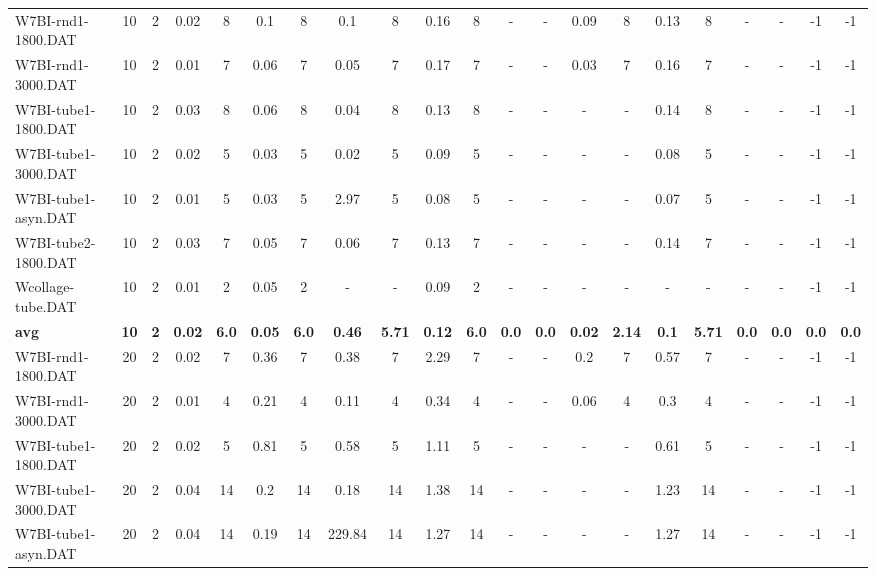 \begin{sidewaystable}[!ht]
{\begin{tabular}{lcccccccccccccccccccc}
W7BI-rnd1-1800.DAT & 10 & 2 &  \textcolor{blue2}{0.02} & 8 & 0.1 & 8 & 0.1 & 8 & 0.16 & 8 &  - &  - & 0.09 & 8 & 0.13 & 8 &  - &  - & -1 & -1 \\
W7BI-rnd1-3000.DAT & 10 & 2 &  \textcolor{blue2}{0.01} & 7 & 0.06 & 7 & 0.05 & 7 & 0.17 & 7 &  - &  - & 0.03 & 7 & 0.16 & 7 &  - &  - & -1 & -1 \\
W7BI-tube1-1800.DAT & 10 & 2 &  \textcolor{blue2}{0.03} & 8 & 0.06 & 8 & 0.04 & 8 & 0.13 & 8 &  - &  - &  - &  - & 0.14 & 8 &  - &  - & -1 & -1 \\
W7BI-tube1-3000.DAT & 10 & 2 &  \textcolor{blue2}{0.02} & 5 & 0.03 & 5 &  \textcolor{blue2}{0.02} & 5 & 0.09 & 5 &  - &  - &  - &  - & 0.08 & 5 &  - &  - & -1 & -1 \\
W7BI-tube1-asyn.DAT & 10 & 2 &  \textcolor{blue2}{0.01} & 5 & 0.03 & 5 & 2.97 & 5 & 0.08 & 5 &  - &  - &  - &  - & 0.07 & 5 &  - &  - & -1 & -1 \\
W7BI-tube2-1800.DAT & 10 & 2 &  \textcolor{blue2}{0.03} & 7 & 0.05 & 7 & 0.06 & 7 & 0.13 & 7 &  - &  - &  - &  - & 0.14 & 7 &  - &  - & -1 & -1 \\
Wcollage-tube.DAT & 10 & 2 &  \textcolor{blue2}{0.01} & 2 & 0.05 & 2 &  - &  - & 0.09 & 2 &  - &  - &  - &  - &  - &  - &  - &  - & -1 & -1 \\
\cline{1-21} \textbf{avg} & \textbf{10} & \textbf{2} & \textbf{0.02} & \textbf{6.0} & \textbf{0.05} & \textbf{6.0} & \textbf{0.46} & \textbf{5.71} & \textbf{0.12} & \textbf{6.0} & \textbf{0.0} & \textbf{0.0} & \textbf{0.02} & \textbf{2.14} & \textbf{0.1} & \textbf{5.71} & \textbf{0.0} & \textbf{0.0} & \textbf{0.0} & \textbf{0.0} \\ \cline{1-21}
W7BI-rnd1-1800.DAT & 20 & 2 &  \textcolor{blue2}{0.02} & 7 & 0.36 & 7 & 0.38 & 7 & 2.29 & 7 &  - &  - & 0.2 & 7 & 0.57 & 7 &  - &  - & -1 & -1 \\
W7BI-rnd1-3000.DAT & 20 & 2 &  \textcolor{blue2}{0.01} & 4 & 0.21 & 4 & 0.11 & 4 & 0.34 & 4 &  - &  - & 0.06 & 4 & 0.3 & 4 &  - &  - & -1 & -1 \\
W7BI-tube1-1800.DAT & 20 & 2 &  \textcolor{blue2}{0.02} & 5 & 0.81 & 5 & 0.58 & 5 & 1.11 & 5 &  - &  - &  - &  - & 0.61 & 5 &  - &  - & -1 & -1 \\
W7BI-tube1-3000.DAT & 20 & 2 &  \textcolor{blue2}{0.04} & 14 & 0.2 & 14 & 0.18 & 14 & 1.38 & 14 &  - &  - &  - &  - & 1.23 & 14 &  - &  - & -1 & -1 \\
W7BI-tube1-asyn.DAT & 20 & 2 &  \textcolor{blue2}{0.04} & 14 & 0.19 & 14 & 229.84 & 14 & 1.27 & 14 &  - &  - &  - &  - & 1.27 & 14 &  - &  - & -1 & -1 \\

\end{tabular}}
\end{sidewaystable}
